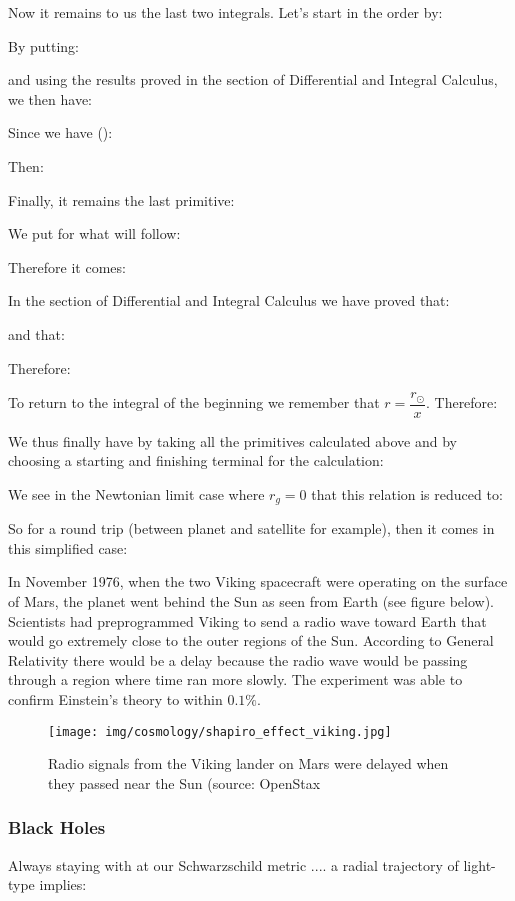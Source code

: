 	Now it remains to us the last two integrals. Let's start in the order by:
	
	By putting:
	
	and using the results proved in the section of Differential and Integral Calculus, we then have:
	
	Since we have ():
	
	Then:
	
	Finally, it remains the last primitive:
	
	We put for what will follow:
	
	Therefore it comes:
	
	In the section of Differential and Integral Calculus we have proved that:
	
	and that:
	
	Therefore:
	
	To return to the integral of the beginning we remember that $r=\dfrac{r_\odot}{x}$. Therefore:
	
	We thus finally have by taking all the primitives calculated above and by choosing a starting and finishing terminal for the calculation:
	
	We see in the Newtonian limit case where $r_g=0$ that this relation is reduced to:
	
	So for a round trip (between planet and satellite for example), then it comes in this simplified case:
	
	In November 1976, when the two Viking spacecraft were operating on the surface of Mars, the planet went
behind the Sun as seen from Earth (see figure below). Scientists had preprogrammed Viking to send a radio wave toward Earth that would go extremely close to the outer regions of the Sun. According to General Relativity there would be a delay because the radio wave would be passing through a region where time ran more slowly. The experiment was able to confirm Einstein’s theory to within $0.1\%$.
	\begin{figure}[H]
		\centering
		\texttt{[image: img/cosmology/shapiro\_effect\_viking.jpg]}	
		\caption{Radio signals from the Viking lander on Mars were delayed when they passed near the Sun (source: OpenStax}
	\end{figure}
	
	\pagebreak
	\subsubsection{Black Holes}
	Always staying with at our Schwarzschild metric .... a radial trajectory of light-type implies:
	
